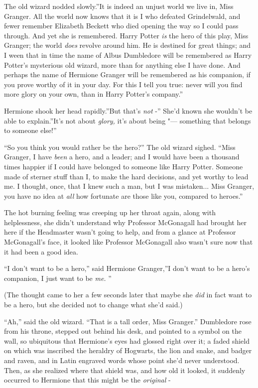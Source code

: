 The old wizard nodded slowly.''It is indeed an unjust world we live in,
Miss Granger. All the world now knows that it is I who defeated
Grindelwald, and fewer remember Elizabeth Beckett who died opening the
way so I could pass through. And yet she is remembered. Harry Potter
\emph{is} the hero of this play, Miss Granger; the world \emph{does}
revolve around him. He is destined for great things; and I ween that in
time the name of Albus Dumbledore will be remembered as Harry Potter's
mysterious old wizard, more than for anything else I have done. And
perhaps the name of Hermione Granger will be remembered as his
companion, if you prove worthy of it in your day. For this I tell you
true: never will you find more glory on your own, than in Harry Potter's
company.''

Hermione shook her head rapidly.''But that's \emph{not} -'' She'd known
she wouldn't be able to explain.''It's not about \emph{glory,} it's
about being "--- something that belongs to someone else!''

``So you think you would rather be the hero?'' The old wizard sighed.
``Miss Granger, I have \emph{been} a hero, and a leader; and I would have
been a thousand times happier if I could have belonged to someone like
Harry Potter. Someone made of sterner stuff than I, to make the hard
decisions, and yet worthy to lead me. I thought, once, that I knew such
a man, but I was mistaken... Miss Granger, you have no idea at
\emph{all} how fortunate are those like you, compared to heroes.''

The hot burning feeling was creeping up her throat again, along with
helplessness, she didn't understand why Professor McGonagall had brought
her here if the Headmaster wasn't going to help, and from a glance at
Professor McGonagall's face, it looked like Professor McGonagall also
wasn't sure now that it had been a good idea.

``I don't want to be a hero,'' said Hermione Granger,''I don't want to
be a hero's companion, I just want to be \emph{me.} ''

(The thought came to her a few seconds later that maybe she \emph{did}
in fact want to be a hero, but she decided not to change what she'd
said.)

``Ah,'' said the old wizard. ``That is a tall order, Miss Granger.''
Dumbledore rose from his throne, stepped out behind his desk, and
pointed to a symbol on the wall, so ubiquitous that Hermione's eyes had
glossed right over it; a faded shield on which was inscribed the
heraldry of Hogwarts, the lion and snake, and badger and raven, and in
Latin engraved words whose point she'd never understood. Then, as she
realized where that shield was, and how old it looked, it suddenly
occurred to Hermione that this might be the \emph{original} -

